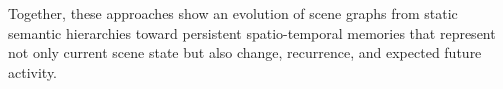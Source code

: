 Together, these approaches show an evolution of scene graphs from static semantic hierarchies toward persistent spatio-temporal memories that represent not only current scene state but also change, recurrence, and expected future activity.

